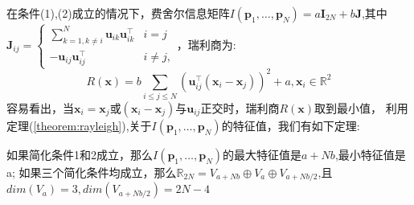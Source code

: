 在条件(1),(2)成立的情况下，费舍尔信息矩阵$I(\bm{p}_1,\dots,\bm{p}_N)=a\bm{I}_{2N}+b\bm{J}$,其中$\bm{J}_{ij}=\begin{cases}
\sum_{k=1,k\neq i}^N \bm{u}_{ik}\bm{u}_{ik}^\intercal &i=j\\
-\bm{u}_{ij}\bm{u}_{ij}^\intercal &i\neq j,
\end{cases}$，瑞利商为:
\begin{equation}
R(\bm{x})=b\sum_{i\leq j\leq N} (\bm{u}_{ij}^\intercal (\bm{x}_i-\bm{x}_j))^2+a,\bm{x}_i\in \mathbb{R}^2
\end{equation}
容易看出，当$\bm{x}_i=\bm{x}_j$或$(\bm{x}_i-\bm{x}_j)$与$\bm{u}_{ij}$正交时，瑞利商$R(\bm{x})$取到最小值，
利用定理(\ref{theorem:rayleigh}),关于$I(\bm{p}_1,\dots,\bm{p}_N)$的特征值，我们有如下定理:
\begin{theorem}
如果简化条件1和2成立，那么$I(\bm{p}_1,\dots,\bm{p}_N)$的最大特征值是$a+Nb$,最小特征值是a;
如果三个简化条件均成立，那么$\mathbb{R}_{2N}=V_{a+Nb}\oplus V_a\oplus V_{a+Nb/2}$,且$dim(V_a)=3,dim(V_{a+Nb/2})=2N-4$
\end{theorem}
